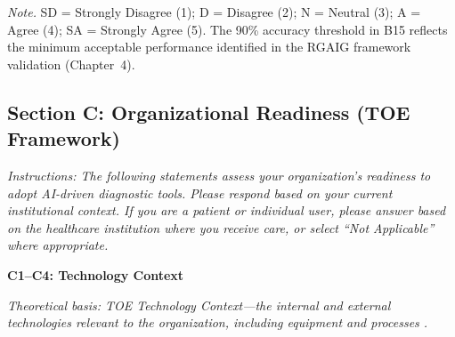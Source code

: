 \vspace{0.5em}\noindent\textit{Note.} SD = Strongly Disagree (1); D = Disagree (2); N = Neutral (3); A = Agree (4); SA = Strongly Agree (5). The 90\% accuracy threshold in B15 reflects the minimum acceptable performance identified in the RGAIG framework validation (Chapter~4).

\subsection{Section C: Organizational Readiness (TOE Framework)}
\label{subsec:survey_toe}

\noindent\textit{Instructions: The following statements assess your organization's readiness to adopt AI-driven diagnostic tools. Please respond based on your current institutional context. If you are a patient or individual user, please answer based on the healthcare institution where you receive care, or select ``Not Applicable'' where appropriate.}

\noindent\textbf{C1--C4: Technology Context}

\noindent\textit{Theoretical basis: TOE Technology Context---the internal and external technologies relevant to the organization, including equipment and processes \cite{tornatzky1990processes}.}


